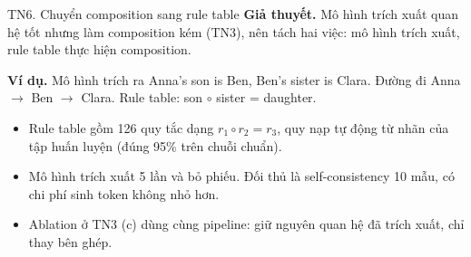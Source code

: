 \documentclass[aspectratio=169,t,10pt]{beamer}
\newcommand{\ex}[1]{{\ttfamily\footnotesize #1}}
\begin{document}
\begin{frame}[shrink]{TN6. Chuyển composition sang rule table}
\small
\textbf{Giả thuyết.} Mô hình trích xuất quan hệ tốt nhưng làm composition kém (TN3), nên tách hai việc: mô hình trích xuất, rule table thực hiện composition.\par
\vspace{4pt}
\centering
{}
\raggedright
\vspace{4pt}
\textbf{Ví dụ.} Mô hình trích ra \ex{Anna's son is Ben}, \ex{Ben's sister is Clara}. Đường đi Anna $\to$ Ben $\to$ Clara. Rule table: son $\circ$ sister = daughter.\par
\vspace{3pt}
\begin{itemize}
  \item Rule table gồm 126 quy tắc dạng $r_1 \circ r_2 = r_3$, quy nạp tự động từ nhãn của tập huấn luyện (đúng 95\% trên chuỗi chuẩn).
  \item Mô hình trích xuất 5 lần và bỏ phiếu. Đối thủ là self-consistency 10 mẫu, có chi phí sinh token không nhỏ hơn.
  \item Ablation ở TN3 (c) dùng cùng pipeline: giữ nguyên quan hệ đã trích xuất, chỉ thay bên ghép.
\end{itemize}
\end{frame}
\end{document}
